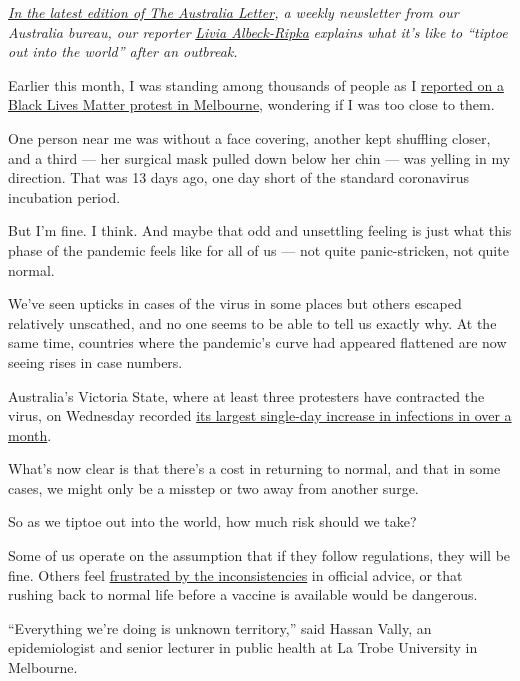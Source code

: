\href{https://www.nytimes3xbfgragh.onion/2020/06/19/world/australia/coronavirus-new-normal.html}{\emph{In
the latest edition of The Australia Letter}}\emph{, a weekly newsletter
from our Australia bureau, our reporter}
\href{https://www.nytimes3xbfgragh.onion/by/livia-albeck-ripka}{\emph{Livia
Albeck-Ripka}} \emph{explains what it's like to ``tiptoe out into the
world'' after an outbreak.}

Earlier this month, I was standing among thousands of people as I
\href{https://www.nytimes3xbfgragh.onion/2020/06/06/world/george-floyd-global-protests.html}{reported
on a Black Lives Matter protest in Melbourne}, wondering if I was too
close to them.

One person near me was without a face covering, another kept shuffling
closer, and a third --- her surgical mask pulled down below her chin ---
was yelling in my direction. That was 13 days ago, one day short of the
standard coronavirus incubation period.

But I'm fine. I think. And maybe that odd and unsettling feeling is just
what this phase of the pandemic feels like for all of us --- not quite
panic-stricken, not quite normal.

We've seen upticks in cases of the virus in some places but others
escaped relatively unscathed, and no one seems to be able to tell us
exactly why. At the same time, countries where the pandemic's curve had
appeared flattened are now seeing rises in case numbers.

Australia's Victoria State, where at least three protesters have
contracted the virus, on Wednesday recorded
\href{https://www.abc.net.au/news/2020-06-17/coronavirus-cases-in-victoria-rise-by-21/12362782}{its
largest single-day increase in infections in over a month}.

What's now clear is that there's a cost in returning to normal, and that
in some cases, we might only be a misstep or two away from another
surge.

So as we tiptoe out into the world, how much risk should we take?

Some of us operate on the assumption that if they follow regulations,
they will be fine. Others feel
\href{https://www.crikey.com.au/2020/06/12/scott-morrisons-double-standards-on-protests-make-it-clear-whose-lives-matters-most/}{frustrated
by the inconsistencies} in official advice, or that rushing back to
normal life before a vaccine is available would be dangerous.

``Everything we're doing is unknown territory,'' said Hassan Vally, an
epidemiologist and senior lecturer in public health at La Trobe
University in Melbourne.

